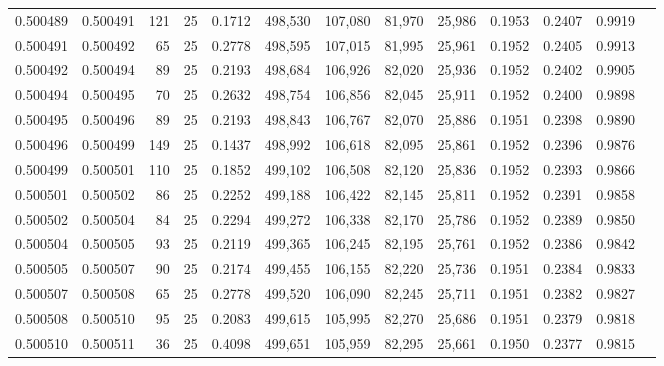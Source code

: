 \begin{tabular}{rrrrrrrrrrrrr}
0.500489 & 0.500491 & 121 &  25 &                                     0.1712 & 498,530 & 107,080 &  81,970 &  25,986 & 0.1953 & 0.2407 & 0.9919 \\
0.500491 & 0.500492 &  65 &  25 &                                     0.2778 & 498,595 & 107,015 &  81,995 &  25,961 & 0.1952 & 0.2405 & 0.9913 \\
0.500492 & 0.500494 &  89 &  25 &                                     0.2193 & 498,684 & 106,926 &  82,020 &  25,936 & 0.1952 & 0.2402 & 0.9905 \\
0.500494 & 0.500495 &  70 &  25 &                                     0.2632 & 498,754 & 106,856 &  82,045 &  25,911 & 0.1952 & 0.2400 & 0.9898 \\
0.500495 & 0.500496 &  89 &  25 &                                     0.2193 & 498,843 & 106,767 &  82,070 &  25,886 & 0.1951 & 0.2398 & 0.9890 \\
0.500496 & 0.500499 & 149 &  25 &                                     0.1437 & 498,992 & 106,618 &  82,095 &  25,861 & 0.1952 & 0.2396 & 0.9876 \\
0.500499 & 0.500501 & 110 &  25 &                                     0.1852 & 499,102 & 106,508 &  82,120 &  25,836 & 0.1952 & 0.2393 & 0.9866 \\
0.500501 & 0.500502 &  86 &  25 &                                     0.2252 & 499,188 & 106,422 &  82,145 &  25,811 & 0.1952 & 0.2391 & 0.9858 \\
0.500502 & 0.500504 &  84 &  25 &                                     0.2294 & 499,272 & 106,338 &  82,170 &  25,786 & 0.1952 & 0.2389 & 0.9850 \\
0.500504 & 0.500505 &  93 &  25 &                                     0.2119 & 499,365 & 106,245 &  82,195 &  25,761 & 0.1952 & 0.2386 & 0.9842 \\
0.500505 & 0.500507 &  90 &  25 &                                     0.2174 & 499,455 & 106,155 &  82,220 &  25,736 & 0.1951 & 0.2384 & 0.9833 \\
0.500507 & 0.500508 &  65 &  25 &                                     0.2778 & 499,520 & 106,090 &  82,245 &  25,711 & 0.1951 & 0.2382 & 0.9827 \\
0.500508 & 0.500510 &  95 &  25 &                                     0.2083 & 499,615 & 105,995 &  82,270 &  25,686 & 0.1951 & 0.2379 & 0.9818 \\
0.500510 & 0.500511 &  36 &  25 &                                     0.4098 & 499,651 & 105,959 &  82,295 &  25,661 & 0.1950 & 0.2377 & 0.9815 \\

\end{tabular}
